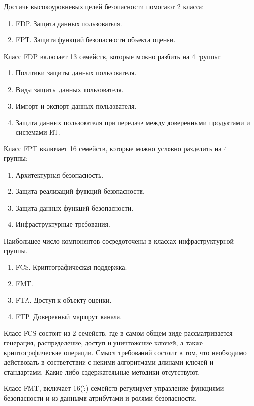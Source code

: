 \documentclass[12pt, russian, oneside, article]{ncc}
\begin{document}
Достичь высокоуровневых целей безопасности помогают 2 класса:
\begin{enumerate}
\item FDP. Защита данных пользователя.
\item FPT. Защита функций безопасности объекта оценки.
\end{enumerate}

Класс FDP включает 13 семейств, которые можно разбить на 4 группы:
\begin{enumerate}
\item Политики защиты данных пользователя.
\item Виды защиты данных пользователя.
\item Импорт и экспорт данных пользователя.
\item Защита данных пользователя при передаче между доверенными продуктами и системами ИТ.
\end{enumerate}

Класс FPT включает 16 семейств, которые можно условно разделить на 4 группы:
\begin{enumerate}
\item Архитектурная безопасность.
\item Защита реализаций функций безопасности.
\item Защита данных функций безопасности.
\item Инфраструктурные требования.
\end{enumerate}

Наибольшее число компонентов сосредоточены в классах инфраструктурной группы.
\begin{enumerate}
\item FCS. Криптографическая поддержка.
\item FMT.
\item FTA. Доступ к объекту оценки.
\item FTP. Доверенный маршрут канала.
\end{enumerate}

Класс FCS состоит из 2 семейств, где в самом общем виде рассматривается генерация, распределение, доступ и уничтожение ключей, а также криптографические операции. Смысл требований состоит в том, что необходимо действовать в соответствии с некими алгоритмами длинами ключей и стандартами. Какие либо содержательные методики отсутствуют.

Класс FMT, включает 16(?) семейств регулирует управление функциями безопасности и из данными атрибутами и ролями безопасности.
\end{document}
